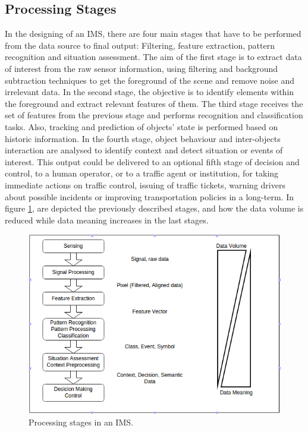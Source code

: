 \subsection{Processing Stages}

In the designing of an IMS, there are four main stages that have to be performed from the data source to final output: Filtering, feature extraction, pattern recognition and situation assessment. The aim of the first stage is to extract data of interest from the raw sensor information, using filtering and background subtraction techniques to get the foreground of the scene and remove noise and irrelevant data. In the second stage, the objective is to identify elements within the foreground and extract relevant features of them. The third stage receives the set of features from the previous stage and performs recognition and classification tasks. Also, tracking and prediction of objects' state is performed based on historic information. In the fourth stage, object behaviour and inter-objects interaction are analysed to identify context and detect situation or events of interest. This output could be delivered to an optional fifth stage of decision and control, to a human operator, or to a traffic agent or institution, for taking immediate actions on traffic control, issuing of traffic tickets, warning drivers about possible incidents or improving transportation policies in a long-term. In figure \ref{proc_stages}, are depicted the previously described stages, and how the data volume is reduced while data meaning increases in the last stages.

\begin{figure}[ht!]
\centering
\includegraphics[scale=0.55]{fig/3/proc_stages.png}
\caption{Processing stages in an IMS.}
\label{proc_stages}
\end{figure}

